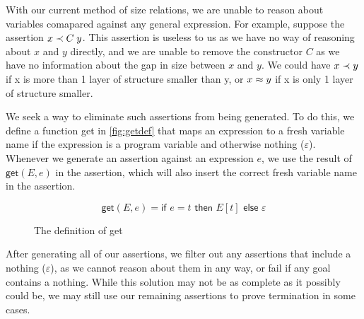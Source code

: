 With our current method of size relations, we are unable to reason about variables
comapared against any general expression. For example, suppose the assertion $x \prec C\; y$.
This assertion is useless to us as we have no way of reasoning about $x$ and $y$ directly,
and we are unable to remove the constructor $C$ as we have no information about the
gap in size between $x$ and $y$. We could have $x \prec y$ if x is more than 1 layer
of structure smaller than y, or $x \approx y$ if x is only 1 layer of structure smaller.

We seek a way to eliminate such assertions from being generated. To do this,
we define a function \textsf{get} in \autoref{fig:getdef} that maps an expression to
a fresh variable name if the expression is a program variable and otherwise nothing 
($\varepsilon$).
Whenever we generate an assertion against an expression $e$, we use the result
of $\textsf{get}(E,e)$ in the assertion, which will also insert the correct fresh
variable name in the assertion.


\begin{figure}
    \centering
    \[
        \textsf{get}(E, e) = \textsf{if } e = t \textsf{ then } E[t] \textsf{ else } \varepsilon
    \]
    
    \caption{The definition of \textsf{get}}
    \label{fig:getdef}
\end{figure}

After generating all of our assertions, we filter out any assertions that include a nothing ($\varepsilon$),
as we cannot reason about them in any way, or fail if any goal contains a nothing. While this solution may
not be as complete as it possibly could be, we may still use our remaining assertions
to prove termination in some cases.

\FloatBarrier

